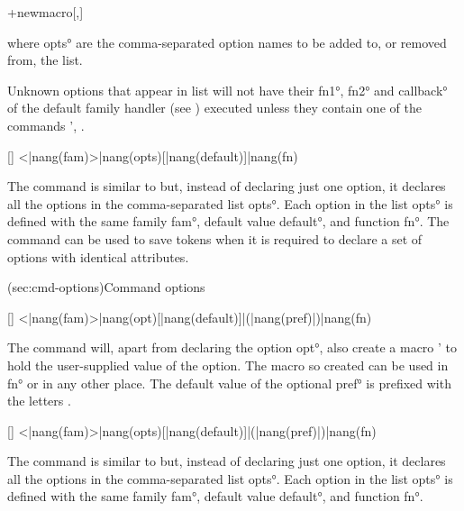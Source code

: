 \documentclass[
  use-a4-paper,
  use-10pt-font,
  final-version,
  use-UK-English,
  fancy-section-headings,
  frame-section-numbers,
  para-abstract-style,
  input-config-file,
  no-hyperref-messages
]{amltxdoc}
\begin{document}
\start+{newmacro}[\AddToExternalOptions,\RemoveFromExternalOptions]
\fxim*{\XExternalOptions,\AddToExternalOptions,\RemoveFromExternalOptions}

where \ang{opts} are the comma-separated option names to be added to, or removed from, the list.

\ltsnote Unknown options that appear in \fx{\XExternalOptions} list will not have their \ang{fn1}, \ang{fn2} and \ang{callback} of the default family handler (see ) executed unless they contain one of the commands \hhx'{\PassOptionsToClass, \PassOptionsToPackage}.

[\XDeclareOptions]
\XDeclareOptions<|nang(fam)>{|nang(opts)}[|nang(default)]{|nang(fn)}
\fxim*{\XDeclareOptions}

The command \fx{\XDeclareOptions} is similar to \fx{\XDeclareOption} but, instead of declaring just one option, it declares all the options in the comma-separated list \ang{opts}. Each option in the list \ang{opts} is defined with the same family \ang{fam}, default value \ang{default}, and function \ang{fn}. The command \fx{\XDeclareOptions} can be used to save tokens when it is required to declare a set of options with identical attributes.


\docsubsection(sec:cmd-options){Command options}

[\XDeclareCommandOption]
\XDeclareCommandOption<|nang(fam)>{|nang(opt)}[|nang(default)]|(|nang(pref)|){|nang(fn)}
\fxim*{\XDeclareCommandOption}

The command \fx{\XDeclareCommandOption} will, apart from declaring the option \ang{opt}, also create a macro \fnl*' to hold the user-supplied value of the option. The macro so created can be used in \ang{fn} or in any other place. The default value of the optional \ang{pref} is  prefixed with the letters .

[\XDeclareCommandOptions]
\XDeclareCommandOptions<|nang(fam)>{|nang(opts)}[|nang(default)]|(|nang(pref)|){|nang(fn)}
\fxim*{\XDeclareCommandOptions}

The command \fx{\XDeclareCommandOptions} is similar to \fx{\XDeclareCommandOption} but, instead of declaring just one option, it declares all the options in the comma-separated list \ang{opts}. Each option in the list \ang{opts} is defined with the same family \ang{fam}, default value \ang{default}, and function \ang{fn}.
\end{document}
